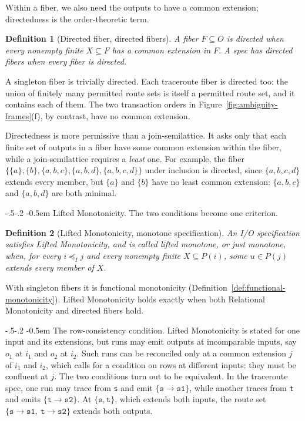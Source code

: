 \documentclass[sigconf]{cidr-2027}
\makeatletter
\newtheorem{definition}{Definition}
\theoremstyle{remark}
\renewcommand\paragraph{\@startsection{paragraph}{4}{\z@}%
  {-.5\baselineskip \@plus -2\p@ \@minus -.2\p@}%
  {-0.5em}%
  {\normalfont\bfseries}}
\newcommand{\InputOrd}{\preceq_I}
\newcommand{\inrel}{extends\xspace}          %
\newcommand{\outrel}{extends\xspace}          %
\newcommand{\spectype}[1][]{I/O specification#1\xspace}
\newcommand{\fiber}[1]{P(#1)}
\makeatother
\begin{document}
Within a fiber, we also need the outputs to have a common extension;
directedness is the order-theoretic term.

\begin{definition}[Directed fiber, directed fibers]
\label{def:fiber-directedness}
A fiber $F\subseteq O$ is \emph{directed} when every nonempty finite
$X\subseteq F$ has a common extension in $F$.  A spec has \emph{directed
fibers} when every fiber is directed.
\end{definition}

A singleton fiber is trivially directed.  Each traceroute fiber is directed
too: the union of finitely many permitted route sets is itself a permitted
route set, and it contains each of them.  The two transaction orders in
Figure~\ref{fig:ambiguity-frames}(f), by contrast, have no common extension.

Directedness is more permissive than a join-semilattice.  It asks only that
each finite set of outputs in a fiber have some common extension within the
fiber, while a join-semilattice requires a \emph{least} one.  For example, the fiber
$\{\{a\},\{b\},\{a,b,c\},\{a,b,d\},\{a,b,c,d\}\}$ under inclusion is directed,
since $\{a,b,c,d\}$ \outrel every member, but $\{a\}$ and $\{b\}$ have no least common extension: $\{a,b,c\}$ and $\{a,b,d\}$ are both minimal.

\paragraph{Lifted Monotonicity.} The two conditions become one
criterion.
\begin{definition}[Lifted Monotonicity, monotone specification]
\label{def:lifted-monotonicity}
An \spectype satisfies \emph{Lifted Monotonicity}, and is called
\emph{lifted monotone}, or just \emph{monotone}, when, for every $i\InputOrd j$ and every nonempty finite
$X\subseteq\fiber{i}$, some $u\in\fiber{j}$ \outrel every member of $X$.
\end{definition}

With singleton fibers it is functional monotonicity
(Definition~\ref{def:functional-monotonicity}). Lifted
Monotonicity holds exactly when both Relational Monotonicity and directed fibers
hold.

\paragraph{The row-consistency condition.}
Lifted Monotonicity is stated for one input and its extensions, but runs may
emit outputs at incomparable inputs, say $o_1$ at $i_1$ and $o_2$ at $i_2$.
Such runs can be reconciled only at a common extension $j$ of $i_1$ and $i_2$, which calls
for a condition on rows at different inputs: they must be confluent at $j$.  The two conditions turn out to be equivalent.
In the traceroute spec, one run may trace from \texttt{s} and emit
$\{\texttt{s}{\to}\texttt{s1}\}$, while another traces from \texttt{t} and
emits $\{\texttt{t}{\to}\texttt{s2}\}$.  At $\{\texttt{s},\texttt{t}\}$, which \inrel both inputs, the route set $\{\texttt{s}{\to}\texttt{s1},\ \texttt{t}{\to}\texttt{s2}\}$ \outrel both outputs.
\end{document}
